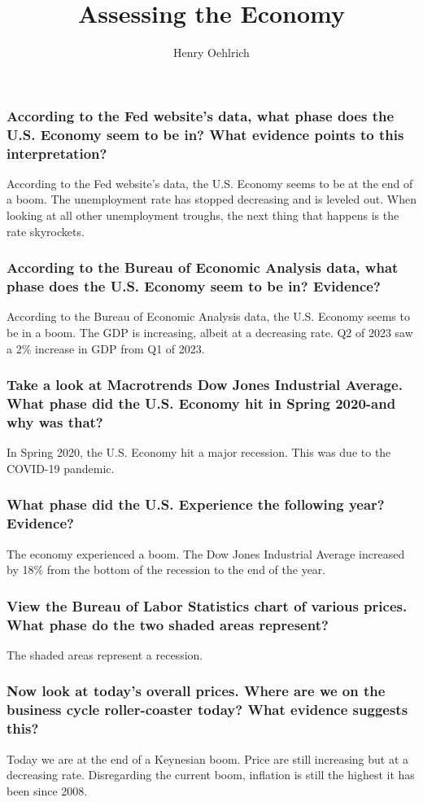 \documentclass{article}
\title{Assessing the Economy}
\author{Henry Oehlrich}
\begin{document}
\maketitle

\subsubsection*{According to the Fed website's data, what phase does the U.S. Economy seem to be in? What evidence points to this interpretation?}

According to the Fed website's data, the U.S. Economy seems to be at the end of
a boom. The unemployment rate has stopped decreasing and is leveled out. When
looking at all other unemployment troughs, the next thing that happens is the
rate skyrockets.

\subsubsection*{According to the Bureau of Economic Analysis data, what phase does the U.S. Economy seem to be in? Evidence?}

According to the Bureau of Economic Analysis data, the U.S. Economy seems to be
in a boom. The GDP is increasing, albeit at a decreasing rate. Q2 of 2023 saw a
2\% increase in GDP from Q1 of 2023.

\subsubsection*{Take a look at Macrotrends Dow Jones Industrial Average. What phase did the U.S. Economy hit in Spring 2020-and why was that?}

In Spring 2020, the U.S. Economy hit a major recession. This was due to the
COVID-19 pandemic.

\subsubsection*{What phase did the U.S. Experience the following year? Evidence?}

The economy experienced a boom. The Dow Jones Industrial Average increased by
18\% from the bottom of the recession to the end of the year.

\subsubsection*{View the Bureau of Labor Statistics chart of various prices. What phase do the two shaded areas represent?}

The shaded areas represent a recession.

\subsubsection*{Now look at today's overall prices. Where are we on the business cycle roller-coaster today? What evidence suggests this?}

Today we are at the end of a Keynesian boom. Price are still increasing but at
a decreasing rate. Disregarding the current boom, inflation is still the
highest it has been since 2008. 
\end{document}
